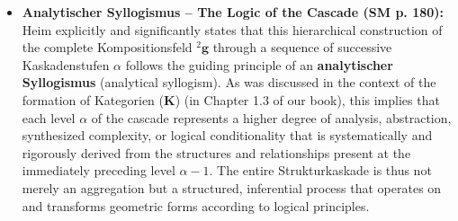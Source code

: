 \documentclass[12pt]{article}
\newcommand{\kategorie}{\bm{K}}
\newcommand{\kompositionsfeld}{{}^2\mathbf{g}}
\newcommand{\kaskadenstufe}{\alpha}
\begin{document}
\begin{itemize}
    \item \textbf{Analytischer Syllogismus – The Logic of the Cascade (SM p. 180):}
    Heim explicitly and significantly states that this hierarchical construction of the complete Kompositionsfeld \( \kompositionsfeld \) through a sequence of successive Kaskadenstufen \( \kaskadenstufe \) follows the guiding principle of an \textbf{analytischer Syllogismus} (analytical syllogism). As was discussed in the context of the formation of Kategorien (\(\kategorie\)) (in Chapter 1.3 of our book), this implies that each level \( \kaskadenstufe \) of the cascade represents a higher degree of analysis, abstraction, synthesized complexity, or logical conditionality that is systematically and rigorously derived from the structures and relationships present at the immediately preceding level \( \kaskadenstufe-1 \). The entire Strukturkaskade is thus not merely an aggregation but a structured, inferential process that operates on and transforms geometric forms according to logical principles.


\end{itemize}
\end{document}

